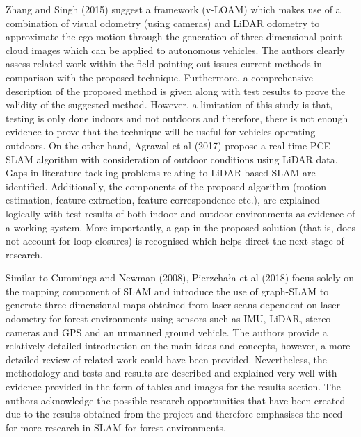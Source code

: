 \documentclass[a4paper, 12pt]{article}
\begin{document}
Zhang and Singh (2015) suggest a framework (v-LOAM) which makes use of a combination of visual odometry (using cameras) and LiDAR odometry to approximate the ego-motion through the generation of three-dimensional point cloud images which can be applied to autonomous vehicles. The authors clearly assess related work within the field pointing out issues current methods in comparison with the proposed technique. Furthermore, a comprehensive description of the proposed method is given along with test results to prove the validity of the suggested method. However, a limitation of this study is that, testing is only done indoors and not outdoors and therefore, there is not enough evidence to prove that the technique will be useful for vehicles operating outdoors. On the other hand, Agrawal et al (2017) propose a real-time PCE-SLAM algorithm with consideration of outdoor conditions using LiDAR data. Gaps in literature tackling problems relating to LiDAR based SLAM are identified. Additionally, the components of the proposed algorithm (motion estimation, feature extraction, feature correspondence etc.), are explained logically with test results of both indoor and outdoor environments as evidence of a working system. More importantly, a gap in the proposed solution (that is, does not account for loop closures) is recognised which helps direct the next stage of research. 

Similar to Cummings and Newman (2008), Pierzchała et al (2018) focus solely on the mapping component of SLAM and introduce the use of graph-SLAM to generate three dimensional maps obtained from laser scans dependent on laser odometry for forest environments using sensors such as IMU, LiDAR, stereo cameras and GPS and an unmanned ground vehicle. The authors provide a relatively detailed introduction on the main ideas and concepts, however, a more detailed review of related work could have been provided. Nevertheless, the methodology and tests and results are described and explained very well with evidence provided in the form of tables and images for the results section. The authors acknowledge the possible research opportunities that have been created due to the results obtained from the project and therefore emphasises the need for more research in SLAM for forest environments.  
\end{document}
